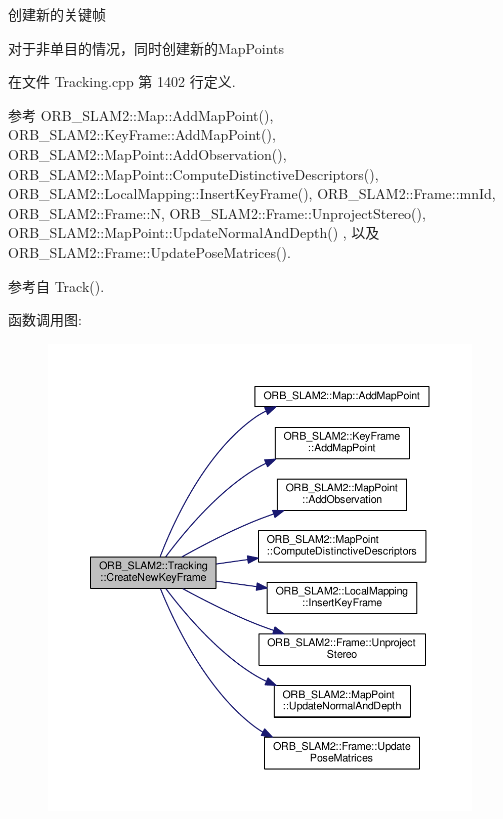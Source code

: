 创建新的关键帧 

对于非单目的情况，同时创建新的\-Map\-Points 

在文件 Tracking.\-cpp 第 1402 行定义.



参考 O\-R\-B\-\_\-\-S\-L\-A\-M2\-::\-Map\-::\-Add\-Map\-Point(), O\-R\-B\-\_\-\-S\-L\-A\-M2\-::\-Key\-Frame\-::\-Add\-Map\-Point(), O\-R\-B\-\_\-\-S\-L\-A\-M2\-::\-Map\-Point\-::\-Add\-Observation(), O\-R\-B\-\_\-\-S\-L\-A\-M2\-::\-Map\-Point\-::\-Compute\-Distinctive\-Descriptors(), O\-R\-B\-\_\-\-S\-L\-A\-M2\-::\-Local\-Mapping\-::\-Insert\-Key\-Frame(), O\-R\-B\-\_\-\-S\-L\-A\-M2\-::\-Frame\-::mn\-Id, O\-R\-B\-\_\-\-S\-L\-A\-M2\-::\-Frame\-::\-N, O\-R\-B\-\_\-\-S\-L\-A\-M2\-::\-Frame\-::\-Unproject\-Stereo(), O\-R\-B\-\_\-\-S\-L\-A\-M2\-::\-Map\-Point\-::\-Update\-Normal\-And\-Depth() , 以及 O\-R\-B\-\_\-\-S\-L\-A\-M2\-::\-Frame\-::\-Update\-Pose\-Matrices().



参考自 Track().



函数调用图\-:
\nopagebreak
\begin{figure}[H]
\begin{center}
\leavevmode
\includegraphics[width=350pt]{classORB__SLAM2_1_1Tracking_a8c7fb6c4b1f952524512023df690bf4d_cgraph}
\end{center}
\end{figure}




